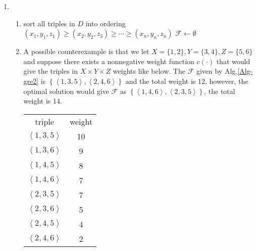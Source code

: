 \documentclass[12pt,a4paper]{article}
\makeatletter
\newtheorem*{solution}{Solution}
\theoremstyle{definition}
\renewenvironment{solution}[1][Solution] {\par\pushQED{\qed}\normalfont\topsep6\p@\@plus6\p@\relax\trivlist\item[\hskip\labelsep\bfseries#1\@addpunct{.}]\ignorespaces}{\popQED\endtrivlist\@endpefalse} \makeatother
\makeatother
\begin{document}
\begin{enumerate}
\begin{solution}
\begin{enumerate}
				\item {\noindent
					\begin{minipage}[t]{0.9\textwidth}
						\centering
						\begin{algorithm}[H]
							\BlankLine
							\caption{$greedy2$} \label{Alg-gre2}
							sort all triples in $D$ into ordering $\left(x_{1}, y_{1}, z_{1}\right) \geq \left(x_{2}, y_{2}, z_{3}\right) \geq \cdots \geq \left(x_{n}, y_{n}, z_{n}\right)$\;
							$\mathcal{F} \leftarrow \emptyset$\;
							\;
						\end{algorithm}
					\end{minipage}
				}
				\item A possible counterexample is that we let $X = \{1,2\}, Y = \{3,4\}, Z = \{5,6\}$ and suppose there exists a nonnegative weight function $c(\cdot)$ that would give the triples in $X \times Y \times Z$ weights like below. The $\mathcal{F}$ given by Alg.\ref{Alg-gre2} is $\left\{ \left\langle 1,3,5 \right\rangle, \left\langle 2,4,6 \right\rangle \right\}$ and the total weight is $12$, however, the optimal solution would give $\mathcal{F}$ as $\left\{ \left\langle 1,4,6 \right\rangle, \left\langle 2,3,5 \right\rangle \right\}$, the total weight is $14$.
				\begin{minipage}{0.9\textwidth}
					\centering
					\label{table1}
					\begin{tabular}[p]{|c|c|}
						\hline
						triple & weight \\
						$\left\langle 1,3,5 \right\rangle$ & 10 \\
						$\left\langle 1,3,6 \right\rangle$ & 9 \\
						$\left\langle 1,4,5 \right\rangle$ & 8 \\
						$\left\langle 1,4,6 \right\rangle$ & 7 \\
						$\left\langle 2,3,5 \right\rangle$ & 7 \\
						$\left\langle 2,3,6 \right\rangle$ & 5 \\
						$\left\langle 2,4,5 \right\rangle$ & 4 \\
						$\left\langle 2,4,6 \right\rangle$ & 2 \\
						\hline
					\end{tabular}
				\end{minipage}
				

\end{enumerate}
\end{solution}
\end{enumerate}
\end{document}
